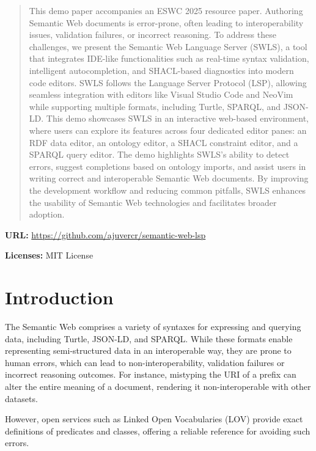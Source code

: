 
\begin{abstract}
This demo paper accompanies an ESWC 2025 resource paper.
Authoring Semantic Web documents is error-prone, often leading to interoperability issues, validation failures, or incorrect reasoning. 
  To address these challenges, we present the Semantic Web Language Server (SWLS), a tool that integrates IDE-like functionalities such as real-time syntax validation, intelligent autocompletion, and SHACL-based diagnostics into modern code editors.
  SWLS follows the Language Server Protocol (LSP), allowing seamless integration with editors like Visual Studio Code and NeoVim while supporting multiple formats, including Turtle, SPARQL, and JSON-LD.
This demo showcases SWLS in an interactive web-based environment, where users can explore its features across four dedicated editor panes: an RDF data editor, an ontology editor, a SHACL constraint editor, and a SPARQL query editor.
  The demo highlights SWLS's ability to detect errors, suggest completions based on ontology imports, and assist users in writing correct and interoperable Semantic Web documents.
  By improving the development workflow and reducing common pitfalls, SWLS enhances the usability of Semantic Web technologies and facilitates broader adoption.
\end{abstract}

\textbf{URL:} \url{https://github.com/ajuvercr/semantic-web-lsp} 

\textbf{Licenses:} MIT License


\section{Introduction}%
\label{sec:introduction}

The Semantic Web comprises a variety of syntaxes for expressing and querying data, including Turtle, JSON-LD, and SPARQL. 
While these formats enable representing semi-structured data in an interoperable way, they are prone to human errors, which can lead to non-interoperability, validation failures or incorrect reasoning outcomes.
For instance, mistyping the URI of a prefix can alter the entire meaning of a document, rendering it non-interoperable with other datasets.

However, open services such as Linked Open Vocabularies (LOV)\cite{LOV2017} provide exact definitions of predicates and classes, offering a reliable reference for avoiding such errors.

